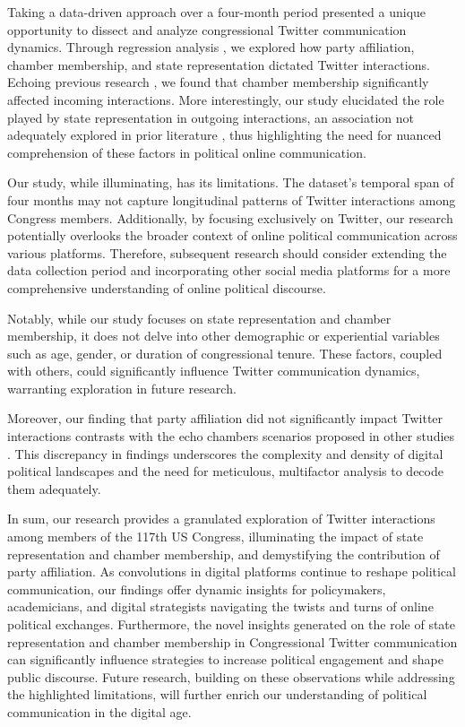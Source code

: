 \documentclass[11pt]{article}
\begin{document}
Taking a data-driven approach over a four-month period presented a unique opportunity to dissect and analyze congressional Twitter communication dynamics. Through regression analysis \cite{Taddy2012MeasuringPS}, we explored how party affiliation, chamber membership, and state representation dictated Twitter interactions. Echoing previous research \cite{Chamberlain2021ANA}, we found that chamber membership significantly affected incoming interactions. More interestingly, our study elucidated the role played by state representation in outgoing interactions, an association not adequately explored in prior literature \cite{Valle2021PoliticalIB}, thus highlighting the need for nuanced comprehension of these factors in political online communication.

Our study, while illuminating, has its limitations. The dataset's temporal span of four months may not capture longitudinal patterns of Twitter interactions among Congress members. Additionally, by focusing exclusively on Twitter, our research potentially overlooks the broader context of online political communication across various platforms. Therefore, subsequent research should consider extending the data collection period and incorporating other social media platforms for a more comprehensive understanding of online political discourse.

Notably, while our study focuses on state representation and chamber membership, it does not delve into other demographic or experiential variables such as age, gender, or duration of congressional tenure. These factors, coupled with others, could significantly influence Twitter communication dynamics, warranting exploration in future research. 

Moreover, our finding that party affiliation did not significantly impact Twitter interactions contrasts with the echo chambers scenarios proposed in other studies \cite{Garimella2017ALA}. This discrepancy in findings underscores the complexity and density of digital political landscapes and the need for meticulous, multifactor analysis to decode them adequately.

In sum, our research provides a granulated exploration of Twitter interactions among members of the 117th US Congress, illuminating the impact of state representation and chamber membership, and demystifying the contribution of party affiliation. As convolutions in digital platforms continue to reshape political communication, our findings offer dynamic insights for policymakers, academicians, and digital strategists navigating the twists and turns of online political exchanges. Furthermore, the novel insights generated on the role of state representation and chamber membership in Congressional Twitter communication can significantly influence strategies to increase political engagement and shape public discourse. Future research, building on these observations while addressing the highlighted limitations, will further enrich our understanding of political communication in the digital age.
\end{document}

